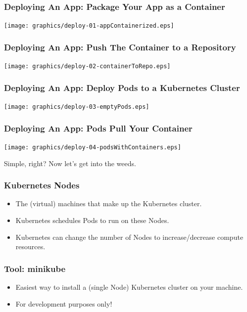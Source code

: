 \documentclass{beamer}
\begin{document}
\begin{frame}
    \frametitle{Deploying An App: Package Your App as a Container}
    \texttt{[image: graphics/deploy-01-appContainerized.eps]}
\end{frame}

\begin{frame}
    \frametitle{Deploying An App: Push The Container to a Repository}
    \texttt{[image: graphics/deploy-02-containerToRepo.eps]}
\end{frame}

\begin{frame}
    \frametitle{Deploying An App: Deploy Pods to a Kubernetes Cluster}
    \texttt{[image: graphics/deploy-03-emptyPods.eps]}
\end{frame}

\begin{frame}
    \frametitle{Deploying An App: Pods Pull Your Container}
    \texttt{[image: graphics/deploy-04-podsWithContainers.eps]}
\end{frame}

\begin{frame}
    \begin{center}
        \Huge Simple, right? Now let's get into the weeds.
    \end{center}
\end{frame}

\begin{frame}
    \frametitle{Kubernetes Nodes}
    \begin{itemize}
        \item The (virtual) machines that make up the Kubernetes cluster.\pause
        \item Kubernetes schedules Pods to run on these Nodes.\pause
        \item Kubernetes can change the number of Nodes to increase/decrease compute resources.
    \end{itemize}
\end{frame}

\begin{frame}
    \frametitle{Tool: minikube\footnotemark}
    \begin{itemize}
        \item Easiest way to install a (single Node) Kubernetes cluster on your machine.
        \item For development purposes only!
    \end{itemize}
\end{frame}
\end{document}
